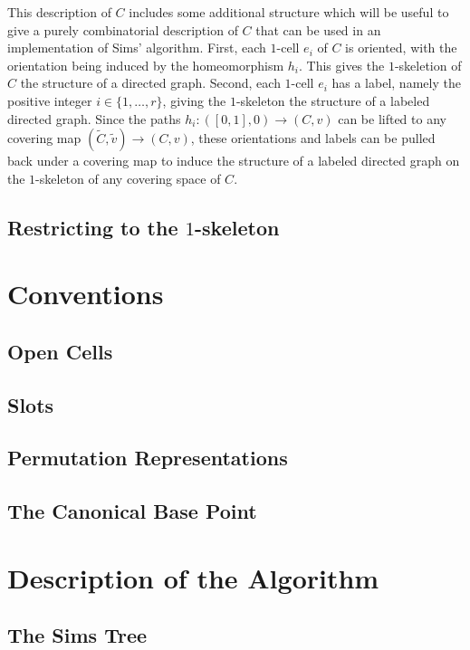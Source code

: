 \documentclass[12pt]{article}
\begin{document}
   This description of $C$ includes some additional structure which will be
   useful to give a purely combinatorial description of $C$ that can be used in
   an implementation of Sims' algorithm.  First, each $1$-cell $e_i$ of $C$ is
   oriented, with the orientation being induced by the homeomorphism $h_i$.
   This gives the $1$-skeletion of $C$ the structure of a directed graph.
   Second, each $1$-cell $e_i$ has a label, namely the positive integer
   $i\in\{1, \ldots, r\}$, giving the $1$-skeleton the structure of a labeled
   directed graph.  Since the paths $h_i:([0,1], 0)\to (C, v)$ can be lifted to
   any covering map $(\tilde C, \tilde v) \to (C, v)$, these orientations and
   labels can be pulled back under a covering map to induce the structure of a
   labeled directed graph on the $1$-skeleton of any covering space of $C$.
   
   \subsection{Restricting to the $1$-skeleton}
   
\section{Conventions}

\subsection{Open Cells}

\subsection{Slots}

\subsection{Permutation Representations}

\subsection{The Canonical Base Point}

\section{Description of the Algorithm}

\subsection{The Sims Tree}
\end{document}
